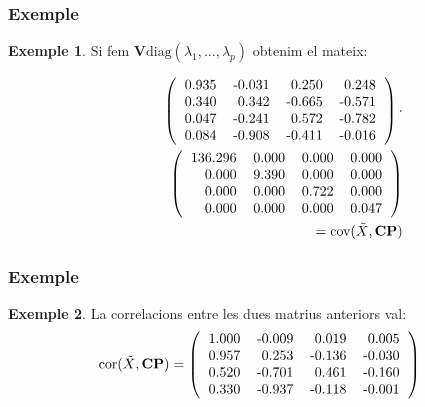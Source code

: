 \documentclass[12pt,t]{beamer}
\theoremstyle{plain}
\theoremstyle{definition}
\newtheorem{exemple}{Exemple}
\begin{document}
\begin{frame}
\frametitle{Exemple}
\begin{exemple}
Si fem $\mathbf{V}\mbox{diag}(\lambda_1,\ldots,\lambda_p)$ obtenim el mateix:
{
\begin{eqnarray*}
&&\left(
\begin{tabular}{rrrr}
  0.935 & -0.031 & 0.250 & 0.248 \\ 
  0.340 & 0.342 & -0.665 & -0.571 \\ 
  0.047 & -0.241 & 0.572 & -0.782 \\ 
  0.084 & -0.908 & -0.411 & -0.016 \\ 
  \end{tabular}\right)\cdot
\\ && \hspace*{1cm}\left(
\begin{tabular}{rrrr}
  136.296 & 0.000 & 0.000 & 0.000 \\ 
  0.000 & 9.390 & 0.000 & 0.000 \\ 
  0.000 & 0.000 & 0.722 & 0.000 \\ 
  0.000 & 0.000 & 0.000 & 0.047 \\ 
  \end{tabular}\right) \\ && = \mbox{cov}(\tilde{X},{\mathbf{CP}})
\end{eqnarray*}

}

\end{exemple}
\end{frame}


\begin{frame}
\frametitle{Exemple}
\begin{exemple}
La correlacions entre les dues matrius anteriors val:
\[
\mbox{cor}(\tilde{X},{\mathbf{CP}})=\left(
\begin{tabular}{rrrr}
  1.000 & -0.009 & 0.019 & 0.005 \\ 
  0.957 & 0.253 & -0.136 & -0.030 \\ 
  0.520 & -0.701 & 0.461 & -0.160 \\ 
  0.330 & -0.937 & -0.118 & -0.001 \\ 
  \end{tabular}\right)
\]

\end{exemple}
\end{frame}
\end{document}

